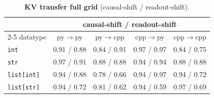 \begin{table}[ht]\centering\small
\caption{\textbf{KV transfer full grid} (causal-shift / readout-shift).}
\label{tab:kv-grid}
\begin{tabular}{lcccc}
\toprule
& \multicolumn{4}{c}{causal-shift / readout-shift} \\
\cmidrule(lr){2-5}
datatype & py$\to$py & py$\to$cpp & cpp$\to$py & cpp$\to$cpp \\
\midrule
\texttt{int} & 0.91 / 0.88 & 0.84 / 0.91 & 0.97 / 0.97 & 0.84 / 0.75 \\
\texttt{str} & 0.97 / 0.91 & 0.88 / 0.88 & 0.94 / 0.94 & 0.88 / 0.88 \\
\texttt{list[int]} & 0.94 / 0.88 & 0.78 / 0.66 & 0.94 / 0.97 & 0.94 / 0.72 \\
\texttt{list[str]} & 0.94 / 0.72 & 0.81 / 0.62 & 0.94 / 0.59 & 0.97 / 0.69 \\
\bottomrule
\end{tabular}
\end{table}
